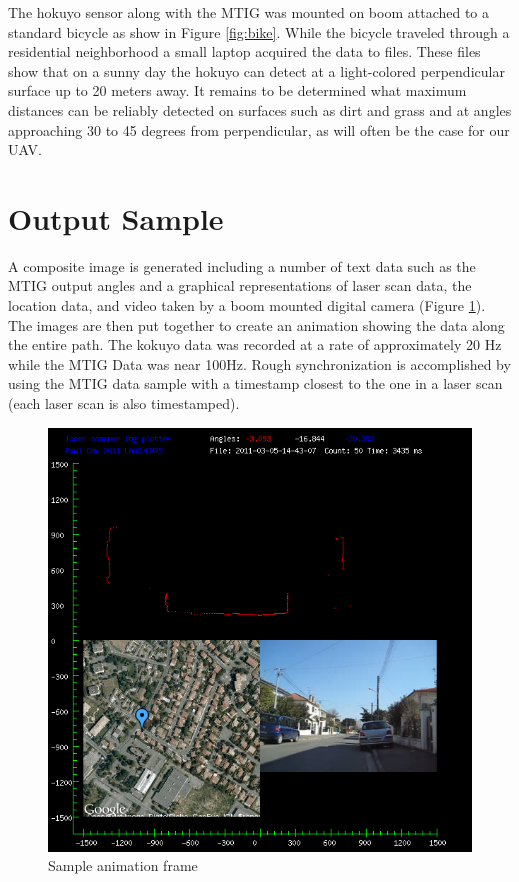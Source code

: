 \documentclass[a4paper,11pt]{report}
\begin{document}
The hokuyo sensor along with the MTIG was mounted on boom attached to a standard bicycle as show in Figure \ref{fig:bike}. While the bicycle traveled through a residential neighborhood a small laptop acquired the data to files. These files show that on a sunny day the hokuyo can detect at a light-colored perpendicular surface up to 20 meters away. It remains to be determined what maximum distances can be reliably detected on surfaces such as dirt and grass and at angles approaching 30 to 45 degrees from perpendicular, as will often be the case for our UAV.

\section{Output Sample}

A composite image is generated including a number of text data such as the MTIG output angles and a graphical representations of laser scan data, the location data, and video taken by a boom mounted digital camera (Figure \ref{fig:plotlogsample}). The images are then put together to create an animation showing the data along the entire path. The kokuyo data was recorded at a rate of approximately 20 Hz while the MTIG Data was near 100Hz. Rough synchronization is accomplished by using the MTIG data sample with a timestamp closest to the one in a laser scan (each laser scan is also timestamped). 

\begin{figure}[ht]
 \centering
 \includegraphics[width=12cm]{./Plotlogsample.png}
 \caption{Sample animation frame}
 \label{fig:plotlogsample}
\end{figure}
\end{document}
